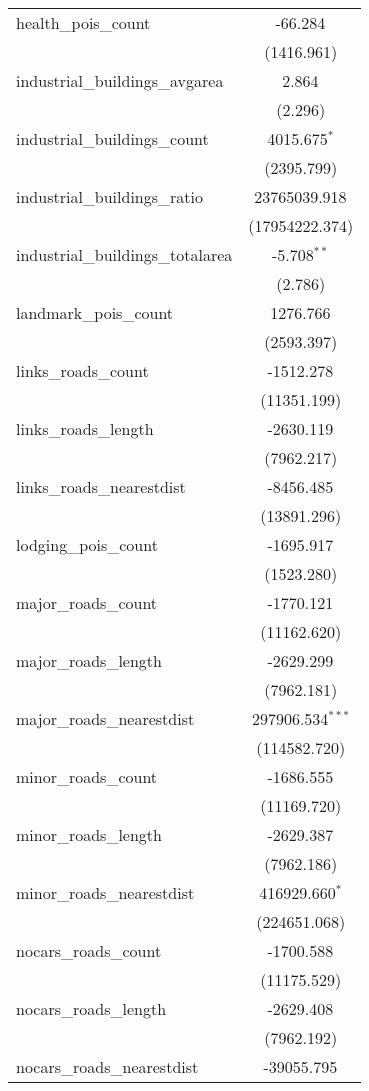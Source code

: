 \begin{table}[!htbp]
\begin{tabular}{@{\extracolsep{5pt}}lc}
 health_pois_count & -66.284$^{}$ \\
  & (1416.961) \\
 industrial_buildings_avgarea & 2.864$^{}$ \\
  & (2.296) \\
 industrial_buildings_count & 4015.675$^{*}$ \\
  & (2395.799) \\
 industrial_buildings_ratio & 23765039.918$^{}$ \\
  & (17954222.374) \\
 industrial_buildings_totalarea & -5.708$^{**}$ \\
  & (2.786) \\
 landmark_pois_count & 1276.766$^{}$ \\
  & (2593.397) \\
 links_roads_count & -1512.278$^{}$ \\
  & (11351.199) \\
 links_roads_length & -2630.119$^{}$ \\
  & (7962.217) \\
 links_roads_nearestdist & -8456.485$^{}$ \\
  & (13891.296) \\
 lodging_pois_count & -1695.917$^{}$ \\
  & (1523.280) \\
 major_roads_count & -1770.121$^{}$ \\
  & (11162.620) \\
 major_roads_length & -2629.299$^{}$ \\
  & (7962.181) \\
 major_roads_nearestdist & 297906.534$^{***}$ \\
  & (114582.720) \\
 minor_roads_count & -1686.555$^{}$ \\
  & (11169.720) \\
 minor_roads_length & -2629.387$^{}$ \\
  & (7962.186) \\
 minor_roads_nearestdist & 416929.660$^{*}$ \\
  & (224651.068) \\
 nocars_roads_count & -1700.588$^{}$ \\
  & (11175.529) \\
 nocars_roads_length & -2629.408$^{}$ \\
  & (7962.192) \\
 nocars_roads_nearestdist & -39055.795$^{}$ \\

\end{tabular}
\end{table}
